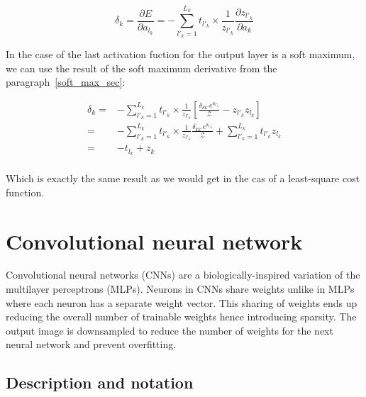 \documentclass[final, paper=letter,5p,times,twocolumn]{elsarticle}
\begin{document}
\begin{equation}
  \delta_{k} = \frac{\partial E}{\partial a_{l_{k}}} = - \sum_{l'_{k} = 1}^{L_{k}} t_{l'_{k}} \times \frac{1}{z_{l'_{k}}} \frac{\partial z_{l'_{k}}}{\partial a_{k}}
  \label{cost_function_error}
\end{equation}

In the case of the last activation fuction for the output layer is a soft maximum, we can use the result of the soft maximum derivative from the paragraph~\ref{soft_max_sec}:

\begin{equation*}
  \begin{split}
    \delta_{k} = & - \sum_{l'_{k} = 1}^{L_{k}} t_{l'_{k}} \times \frac{1}{z_{l'_{k}}} \left \lbrack  \frac{\delta_{kk'} e^{a_{l'_{k}}}}{\mathcal{Z}} - z_{l'_{k}}z_{l_{k}} \right \rbrack \\
    = & - \sum_{l'_{k} = 1}^{L_{k}} t_{l'_{k}} \times \frac{1}{z_{l'_{k}}} \frac{\delta_{kk'} e^{a_{l'_{k}}}}{\mathcal{Z}} +  \sum_{l'_{k} = 1}^{L_{k}} t_{l'_{k}} z_{l_{k}} \\
    = & - t_{l_{k}} +  z_{k} \\
  \end{split}
\end{equation*}



Which is exactly the same result as we would get in the cas of a least-square cost function.


\section{Convolutional neural network}

Convolutional neural networks (CNNs) are a biologically-inspired variation of the multilayer perceptrons (MLPs). Neurons in CNNs share weights unlike in MLPs where each neuron has a separate weight vector. This sharing of weights ends up reducing the overall number of trainable weights hence introducing sparsity. The output image is downsampled to reduce the number of weights for the next neural network and prevent overfitting.

\subsection{Description and notation}
\end{document}
